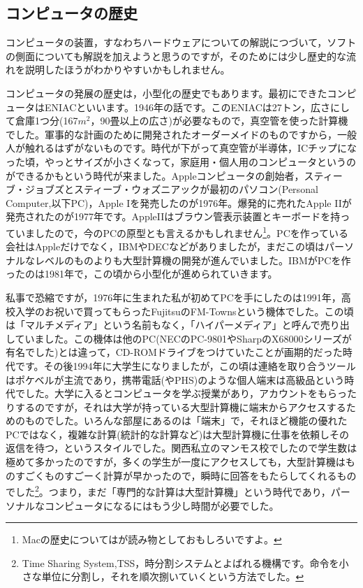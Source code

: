 \documentclass{ltjsbook}
\begin{document}
\subsection{コンピュータの歴史}
コンピュータの装置，すなわちハードウェアについての解説につづいて，ソフトの側面についても解説を加えようと思うのですが，そのためには少し歴史的な流れを説明したほうがわかりやすいかもしれません。

コンピュータの発展の歴史は，小型化の歴史でもあります。最初にできたコンピュータはENIACといいます。1946年の話です。このENIACは27トン，広さにして倉庫1つ分(167$m^2$，90畳以上の広さ)が必要なもので，真空管を使った計算機でした。軍事的な計画のために開発されたオーダーメイドのものですから，一般人が触れるはずがないものです。時代が下がって真空管が半導体，ICチップになった頃，やっとサイズが小さくなって，家庭用・個人用のコンピュータというのができるかもという時代が来ました。Appleコンピュータの創始者，スティーブ・ジョブズとスティーブ・ウォズニアックが最初のパソコン(Personal Computer,以下PC)，Apple Iを発売したのが1976年。爆発的に売れたApple IIが発売されたのが1977年です。AppleIIはブラウン管表示装置とキーボードを持っていましたので，今のPCの原型とも言えるかもしれません\footnote{Macの歴史については\textcite{Isaacson2012}が読み物としておもしろいですよ。}。PCを作っている会社はAppleだけでなく，IBMやDECなどがありましたが，まだこの頃はパーソナルなレベルのものよりも大型計算機の開発が進んでいました。IBMがPCを作ったのは1981年で，この頃から小型化が進められていきます。

私事で恐縮ですが，1976年に生まれた私が初めてPCを手にしたのは1991年，高校入学のお祝いで買ってもらったFujitsuのFM-Townsという機体でした。この頃は「マルチメディア」という名前もなく，「ハイパーメディア」と呼んで売り出していました。この機体は他のPC(NECのPC-9801やSharpのX68000シリーズが有名でした)とは違って，CD-ROMドライブをつけていたことが画期的だった時代です。その後1994年に大学生になりましたが，この頃は連絡を取り合うツールはポケベルが主流であり，携帯電話(やPHS)のような個人端末は高級品という時代でした。大学に入るとコンピュータを学ぶ授業があり，アカウントをもらったりするのですが，それは大学が持っている大型計算機に端末からアクセスするためのものでした。いろんな部屋にあるのは「端末」で，それほど機能の優れたPCではなく，複雑な計算(統計的な計算など)は大型計算機に仕事を依頼しその返信を待つ，というスタイルでした。関西私立のマンモス校でしたので学生数は極めて多かったのですが，多くの学生が一度にアクセスしても，大型計算機はものすごくものすごーく計算が早かったので，瞬時に回答をもたらしてくれるものでした\footnote{Time Sharing System,TSS，時分割システムとよばれる機構です。命令を小さな単位に分割し，それを順次捌いていくという方法でした。}。つまり，まだ「専門的な計算は大型計算機」という時代であり，パーソナルなコンピュータになるにはもう少し時間が必要でした。
\end{document}
